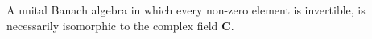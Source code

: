 A unital Banach algebra in which every non-zero element is invertible, is necessarily isomorphic to the complex field $\mathbf{C}$.
